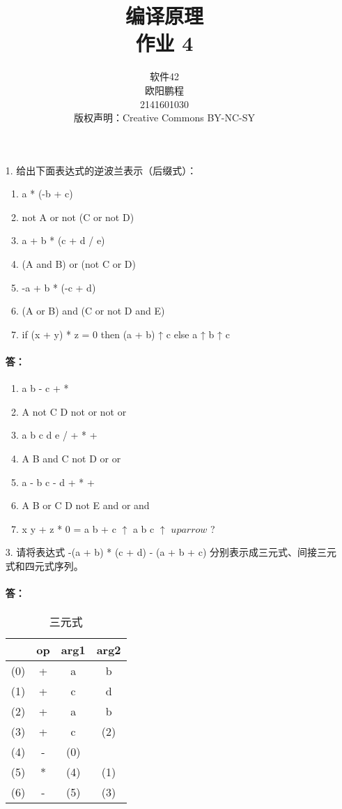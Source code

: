 \documentclass[]{ctexart}
\title{编译原理 \\ 作业 4}
\author{软件42 \\ 欧阳鹏程 \\ 2141601030 \\ 版权声明：Creative Commons BY-NC-SY}
\begin{document}
\maketitle

\begin{enumerate}
	\item[1.] 给出下面表达式的逆波兰表示（后缀式）：
	\begin{enumerate}
		\item a * (-b + c)
		\item not A or not (C or not D)
		\item a + b * (c + d / e)
		\item (A and B) or (not C or D)
		\item -a + b * (-c + d)
		\item (A or B) and (C or not D and E)
		\item if (x + y) * z = 0 then (a + b) ↑ c else a ↑ b ↑ c
	\end{enumerate}
	\paragraph{答：}
	\begin{enumerate}
		\item a b - c + *
		\item A not C D not or not or
		\item a b c d e / + * +
		\item A B and C not D or or
		\item a - b c - d + * +
		\item A B or  C D not E and or and
		\item x y + z * 0 = a b + c $\uparrow$ a b c $\uparrow$ $uparrow$ ?
	\end{enumerate}
	
	\item[3.] 请将表达式 -(a + b) * (c + d) - (a + b + c) 分别表示成三元式、间接三元式和四元式序列。
	\paragraph{答：}
	\begin{table}[H]
		\centering
		\caption{三元式}
		\begin{tabular}{|c|c|c|c|}
			\hline
			~ & op & arg1 & arg2 \\\hline
			(0) & + & a & b \\
			(1) & + & c & d \\
			(2) & + & a & b \\
			(3) & + & c & (2) \\
			(4) & - & (0) & ~ \\
			(5) & * & (4) & (1) \\
			(6) & - & (5) & (3) \\\hline
		\end{tabular}
	\end{table}


\end{enumerate}
\end{document}
